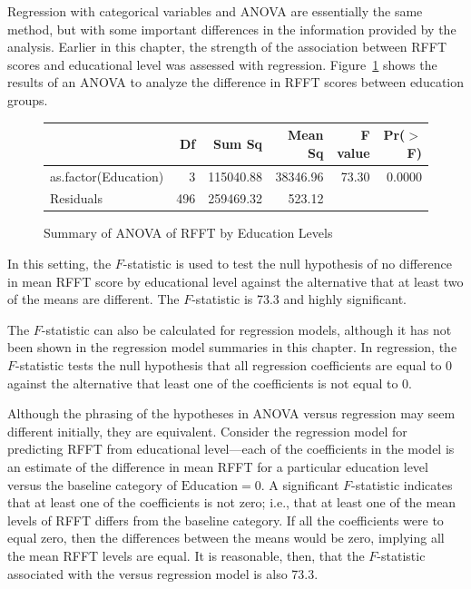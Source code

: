 
Regression with categorical variables and ANOVA are essentially the same method, but with some important differences in the information provided by the analysis. Earlier in this chapter, the strength of the association between RFFT scores and educational level was assessed with regression. Figure~\ref{prevendANOVARFFTEduc} shows the results of an ANOVA to analyze the difference in RFFT scores between education groups.

\begin{figure}[ht]
\centering
\begin{tabular}{lrrrrr}
  \hline
 & Df & Sum Sq & Mean Sq & F value & Pr($>$F) \\ 
  \hline
as.factor(Education) & 3 & 115040.88 & 38346.96 & 73.30 & 0.0000 \\ 
  Residuals            & 496 & 259469.32 & 523.12 &  &  \\ 
   \hline
\end{tabular}
\caption{Summary of ANOVA of RFFT by Education Levels} 
\label{prevendANOVARFFTEduc}
\end{figure}

In this setting, the $F$-statistic is used to test the null hypothesis of no difference in mean RFFT score by educational level against the alternative that at least two of the means are different. The $F$-statistic is 73.3 and highly significant. 

The $F$-statistic can also be calculated for regression models, although it has not been shown in the regression model summaries in this chapter. In regression, the $F$-statistic tests the null hypothesis that all regression coefficients are equal to 0 against the alternative that least one of the coefficients is not equal to 0. 

Although the phrasing of the hypotheses in ANOVA versus regression may seem different initially, they are equivalent. Consider the regression model for predicting RFFT from educational level---each of the coefficients in the model is an estimate of the difference in mean RFFT for a particular education level versus the baseline category of $\text{Education} = 0$. A significant $F$-statistic indicates that at least one of the coefficients is not zero; i.e., that at least one of the mean levels of RFFT differs from the baseline category. If all the coefficients were to equal zero, then the differences between the means would be zero, implying all the mean RFFT levels are equal. It is reasonable, then, that the $F$-statistic associated with the  versus  regression model is also 73.3. 

